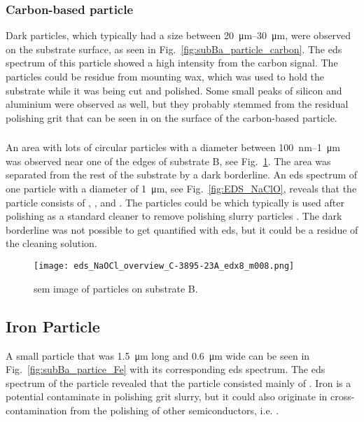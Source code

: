 \subsubsection{Carbon-based particle}
Dark particles, which typically had a size between \SIrange{20}{30}{\micro\metre}, were observed on the substrate surface, as seen in Fig.~\ref{fig:subBa_particle_carbon}. The \ac{eds} spectrum of this particle showed a high intensity from the carbon signal. The particles could be residue from mounting wax, which was used to hold the substrate while it was being cut and polished. Some small peaks of silicon and aluminium were observed as well, but they probably stemmed from the residual polishing grit that can be seen in on the surface of the carbon-based particle.

\subsubsection{}
An area with lots of circular particles with a diameter between \SI{100}{\nano\metre}--\SI{1}{\micro\metre} was observed near one of the edges of substrate B, see Fig.~\ref{fig:eds_NaOCl_overview}. The area was separated from the rest of the substrate by a dark borderline. An \ac{eds} spectrum of one particle with a diameter of \SI{1}{\micro\metre}, see Fig.~\ref{fig:EDS_NaClO}, reveals that the particle consists of , , and . The particles could be  which typically is used after polishing as a standard cleaner to remove polishing slurry particles \citep{benson2015as-received}. The dark borderline was not possible to get quantified with \ac{eds}, but it could be a residue of the cleaning solution.

\begin{figure}[htbp]
    \centering
    \texttt{[image: eds\_NaOCl\_overview\_C-3895-23A\_edx8\_m008.png]}
    \caption[\Ac{sem} image of  particles on substrate B.]{\Ac{sem} image of  particles on substrate B.}
    \label{fig:eds_NaOCl_overview}
\end{figure}

\subsection{Iron Particle}
A small particle that was \SI{1.5}{\micro\metre} long and \SI{0.6}{\micro\metre} wide can be seen in Fig.~\ref{fig:subBa_partice_Fe} with its corresponding \ac{eds} spectrum. The \ac{eds} spectrum of the particle revealed that the particle consisted mainly of . Iron is a potential contaminate in polishing grit slurry, but it could also originate in cross-contamination from the polishing of other semiconductors, i.e.  \citep{benson2015as-received}.

